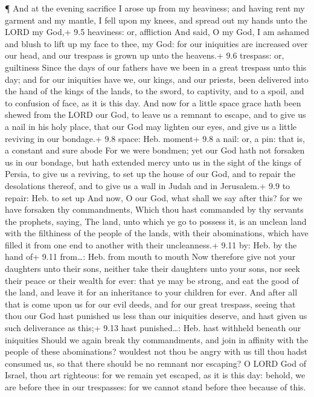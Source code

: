  ¶ And at the evening sacrifice I arose up from my
heaviness; and having rent my garment and my mantle, I fell upon my
knees, and spread out my hands unto the LORD my God,+ 9.5 heaviness: or,
affliction  And said, O my God, I am ashamed and blush to
lift up my face to thee, my God: for our iniquities are increased over
our head, and our trespass is grown up unto the heavens.+ 9.6 trespass:
or, guiltiness  Since the days of our fathers have we been
in a great trespass unto this day; and for our iniquities have we, our
kings, and our priests, been delivered into the hand of the kings of the
lands, to the sword, to captivity, and to a spoil, and to confusion of
face, as it is this day.  And now for a little space grace
hath been shewed from the LORD our God, to leave us a remnant to escape,
and to give us a nail in his holy place, that our God may lighten our
eyes, and give us a little reviving in our bondage.+ 9.8 space: Heb.
moment+ 9.8 a nail: or, a pin: that is, a constant and sure abode
 For we were bondmen; yet our God hath not forsaken us in
our bondage, but hath extended mercy unto us in the sight of the kings
of Persia, to give us a reviving, to set up the house of our God, and to
repair the desolations thereof, and to give us a wall in Judah and in
Jerusalem.+ 9.9 to repair: Heb. to set up  And now, O our
God, what shall we say after this? for we have forsaken thy
commandments,  Which thou hast commanded by thy servants
the prophets, saying, The land, unto which ye go to possess it, is an
unclean land with the filthiness of the people of the lands, with their
abominations, which have filled it from one end to another with their
uncleanness.+ 9.11 by: Heb. by the hand of+ 9.11 from\ldots: Heb. from
mouth to mouth  Now therefore give not your daughters unto
their sons, neither take their daughters unto your sons, nor seek their
peace or their wealth for ever: that ye may be strong, and eat the good
of the land, and leave it for an inheritance to your children for ever.
 And after all that is come upon us for our evil deeds, and
for our great trespass, seeing that thou our God hast punished us less
than our iniquities deserve, and hast given us such deliverance as
this;+ 9.13 hast punished\ldots: Heb. hast withheld beneath our
iniquities  Should we again break thy commandments, and
join in affinity with the people of these abominations? wouldest not
thou be angry with us till thou hadst consumed us, so that there should
be no remnant nor escaping?  O LORD God of Israel, thou art
righteous: for we remain yet escaped, as it is this day: behold, we are
before thee in our trespasses: for we cannot stand before thee because
of this.

